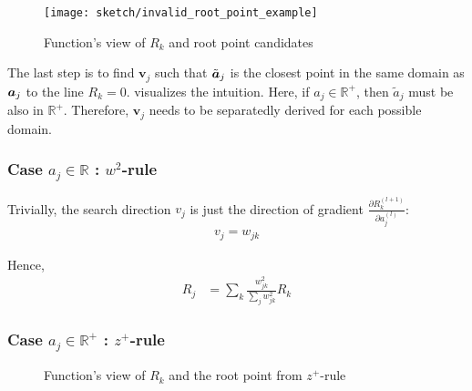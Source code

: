 \begin{figure}[!hbt]
\centering
\texttt{[image: sketch/invalid\_root\_point\_example]}
\caption{Function's view of $R_k$  and root point candidates}
\label{fig:root_point_illus}
\end{figure}



The last step is to find $\boldsymbol{v}_j$ such that $\tilde{\patvector{a}}_j$ is the closest point in the same domain as $\patvector{a}_j$ to the line $R_k=0$. \addfigure{\ref{fig:root_point_illus}} visualizes the intuition. Here, if $a_j \in \mathbb{R}^+$, then $\tilde{a}_j$ must be also in $\mathbb{R}^+$. Therefore, $\boldsymbol{v}_j$ needs to be separatedly derived for each possible domain.


\subsubsection{Case $a_j \in \mathbb{R}$ : $w^2$-rule}

Trivially, the search direction $v_j$ is just the direction of gradient $\frac{\partial  R_k^{(l+1)} }{ \partial a_j^{(l)} }$:
\begin{align*}
	v_j = w_{jk}
\end{align*}

Hence, 
\begin{align*}
	R_j &=	\sum_k \frac{ w_{jk}^2  }{\sum_{j} w_{jk}^2}  R_k
\end{align*}

\subsubsection{Case $a_j \in \mathbb{R}^+$ : $z^+$-rule}
\begin{figure}[!htb]
\centering
{}
\caption{Function's view of $R_k$ and the root point from $z^+$-rule}
\label{fig:zplus_rule_cases}
\end{figure}

